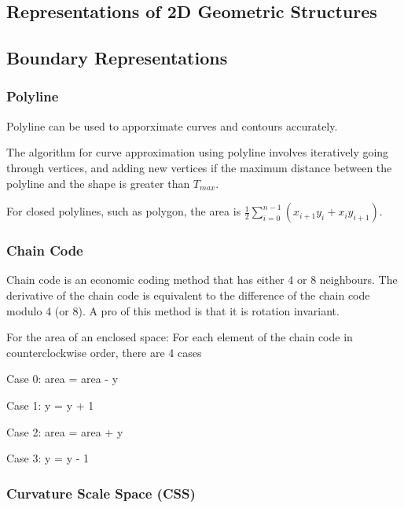 \documentclass{article}
\begin{document}
\begin{multicols}{2}
 \section{Representations of 2D Geometric Structures}
 \subsection{Boundary Representations}
 \subsubsection{Polyline}

  Polyline can be used to apporximate curves and contours accurately.
  
  The algorithm for curve approximation using polyline involves iteratively going through vertices, and adding new vertices if the maximum distance between the polyline and the shape is greater than $T_{max}$.

  For closed polylines, such as polygon, the area is $\frac{1}{2}\sum_{i=0}^{n-1}(x_{i+1}y_i + x_iy_{i+1})$.

 \subsubsection{Chain Code}

  Chain code is an economic coding method that has either 4 or 8 neighbours.
  The derivative of the chain code is equivalent to the difference of the chain code modulo 4 (or 8).
  A pro of this method is that it is rotation invariant.

  For the area of an enclosed space:
  For each element of the chain code in counterclockwise order, there are 4 cases
  
  \vspace{2mm}
  
  Case 0: area = area - y

  \vspace{2mm}

  Case 1: y = y + 1

  \vspace{2mm}

  Case 2: area = area + y

  \vspace{2mm}

  Case 3: y = y - 1

 \subsubsection{Curvature Scale Space (CSS)}


\end{multicols}
\end{document}
